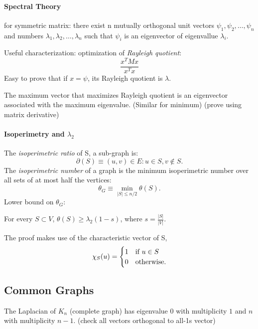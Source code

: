 \paragraph{Spectral Theory}
for symmetric matrix: there exist n mutually orthogonal unit vectors $\psi_1, \psi_2, \ldots, \psi_n $ and numbers $ \lambda_1, \lambda_2, \ldots, \lambda_n $ such that
$\psi_i$ is an eigenvector of eigenvallue $\lambda_i$.

Useful characterization: optimization of {\em Rayleigh quotient}:
$$ \frac{x^T M x}{x^T x} $$
Easy to prove that if $ x = \psi $, its Rayleigh quotient is $ \lambda $.

\begin{theorem}
  The maximum vector that maximizes Rayleigh quotient is an eigenvector associated with the maximum eigenvalue. (Similar for minimum)
  (prove using matrix derivative)
\end{theorem}

\paragraph{Isoperimetry and $ \lambda_2 $ } The {\em isoperimetric ratio} of S, a sub-graph is:
$$ \partial (S) \equiv { (u, v) \in E: u \in S, v \not\in S}. $$
The {\em isoperimetric number} of a graph is the minimum isoperimetric number over all sets of at most half the vertices:
$$ \theta_G \equiv \min_{|S| \le n/2} \theta (S). $$
Lower bound on $ \theta_G $:

\begin{theorem}
  For every $ S \subset V $,
  $ \theta (S) \ge \lambda_2 (1 - s) $,
  where $ s = \frac{|S|}{|V|} $.
\end{theorem}
The proof makes use of the characteristic vector of S, 
$$ \chi_S (u) =
  \begin{cases}
    1 & \text{if $ u \in S $} \\
    0 & \text{otherwise.}
  \end{cases}
$$

\subsection{Common Graphs}

\begin{lemma}
  The Laplacian of $K_n$ (complete graph) has eigenvalue $0$ with multiplicity $1$ and $n$ with multiplicity $ n - 1 $. (check all vectors orthogonal to all-1s vector)
\end{lemma}

